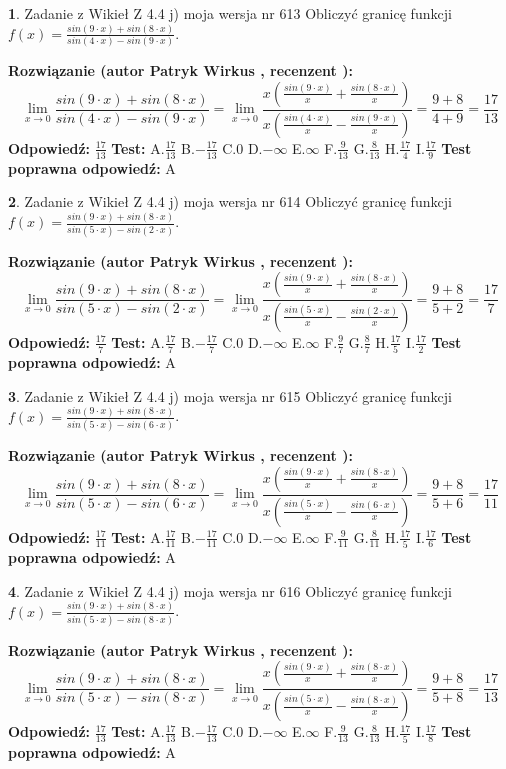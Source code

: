 \documentclass[12pt, a4paper]{article}
\theoremstyle{definition} %
\newtheorem{zad}{}
\newcommand{\zadStart}[1]{\begin{zad}#1\newline}
\newcommand{\zadStop}{\end{zad}}
\newcommand{\rozwStart}[2]{\noindent \textbf{Rozwiązanie (autor #1 , recenzent #2): }\newline}
\newcommand{\rozwStop}{\newline}
\newcommand{\odpStart}{\noindent \textbf{Odpowiedź:}\newline}
\newcommand{\odpStop}{\newline}
\newcommand{\testStart}{\noindent \textbf{Test:}\newline}
\newcommand{\testStop}{\newline}
\newcommand{\kluczStart}{\noindent \textbf{Test poprawna odpowiedź:}\newline}
\newcommand{\kluczStop}{\newline}
\begin{document}
\zadStart{Zadanie z Wikieł Z 4.4 j) moja wersja nr 613}
Obliczyć granicę funkcji $f(x)=\frac{sin(9\cdot x) +sin(8\cdot x)}{sin(4\cdot x) -sin(9\cdot x)}$.
\zadStop
\rozwStart{Patryk Wirkus}{}
$$\lim\limits_{x\to 0}\frac{sin(9\cdot x) +sin(8\cdot x)}{sin(4\cdot x) -sin(9\cdot x)}=\lim\limits_{x\to 0}\frac{x(\frac{sin(9\cdot x)}{x}+\frac{sin(8\cdot x)}{x})}{x(\frac{sin(4\cdot x)}{x}-\frac{sin(9\cdot x)}{x})}=\frac{9+8}{4+9} = \frac{17}{13}$$
\rozwStop
\odpStart
$\frac{17}{13}$
\odpStop
\testStart
A.$\frac{17}{13}$
B.$-\frac{17}{13}$
C.$0$
D.$-\infty$
E.$\infty$
F.$\frac{9}{13}$
G.$\frac{8}{13}$
H.$\frac{17}{4}$
I.$\frac{17}{9}$
\testStop
\kluczStart
A
\kluczStop



\zadStart{Zadanie z Wikieł Z 4.4 j) moja wersja nr 614}
Obliczyć granicę funkcji $f(x)=\frac{sin(9\cdot x) +sin(8\cdot x)}{sin(5\cdot x) -sin(2\cdot x)}$.
\zadStop
\rozwStart{Patryk Wirkus}{}
$$\lim\limits_{x\to 0}\frac{sin(9\cdot x) +sin(8\cdot x)}{sin(5\cdot x) -sin(2\cdot x)}=\lim\limits_{x\to 0}\frac{x(\frac{sin(9\cdot x)}{x}+\frac{sin(8\cdot x)}{x})}{x(\frac{sin(5\cdot x)}{x}-\frac{sin(2\cdot x)}{x})}=\frac{9+8}{5+2} = \frac{17}{7}$$
\rozwStop
\odpStart
$\frac{17}{7}$
\odpStop
\testStart
A.$\frac{17}{7}$
B.$-\frac{17}{7}$
C.$0$
D.$-\infty$
E.$\infty$
F.$\frac{9}{7}$
G.$\frac{8}{7}$
H.$\frac{17}{5}$
I.$\frac{17}{2}$
\testStop
\kluczStart
A
\kluczStop



\zadStart{Zadanie z Wikieł Z 4.4 j) moja wersja nr 615}
Obliczyć granicę funkcji $f(x)=\frac{sin(9\cdot x) +sin(8\cdot x)}{sin(5\cdot x) -sin(6\cdot x)}$.
\zadStop
\rozwStart{Patryk Wirkus}{}
$$\lim\limits_{x\to 0}\frac{sin(9\cdot x) +sin(8\cdot x)}{sin(5\cdot x) -sin(6\cdot x)}=\lim\limits_{x\to 0}\frac{x(\frac{sin(9\cdot x)}{x}+\frac{sin(8\cdot x)}{x})}{x(\frac{sin(5\cdot x)}{x}-\frac{sin(6\cdot x)}{x})}=\frac{9+8}{5+6} = \frac{17}{11}$$
\rozwStop
\odpStart
$\frac{17}{11}$
\odpStop
\testStart
A.$\frac{17}{11}$
B.$-\frac{17}{11}$
C.$0$
D.$-\infty$
E.$\infty$
F.$\frac{9}{11}$
G.$\frac{8}{11}$
H.$\frac{17}{5}$
I.$\frac{17}{6}$
\testStop
\kluczStart
A
\kluczStop



\zadStart{Zadanie z Wikieł Z 4.4 j) moja wersja nr 616}
Obliczyć granicę funkcji $f(x)=\frac{sin(9\cdot x) +sin(8\cdot x)}{sin(5\cdot x) -sin(8\cdot x)}$.
\zadStop
\rozwStart{Patryk Wirkus}{}
$$\lim\limits_{x\to 0}\frac{sin(9\cdot x) +sin(8\cdot x)}{sin(5\cdot x) -sin(8\cdot x)}=\lim\limits_{x\to 0}\frac{x(\frac{sin(9\cdot x)}{x}+\frac{sin(8\cdot x)}{x})}{x(\frac{sin(5\cdot x)}{x}-\frac{sin(8\cdot x)}{x})}=\frac{9+8}{5+8} = \frac{17}{13}$$
\rozwStop
\odpStart
$\frac{17}{13}$
\odpStop
\testStart
A.$\frac{17}{13}$
B.$-\frac{17}{13}$
C.$0$
D.$-\infty$
E.$\infty$
F.$\frac{9}{13}$
G.$\frac{8}{13}$
H.$\frac{17}{5}$
I.$\frac{17}{8}$
\testStop
\kluczStart
A
\kluczStop
\end{document}
